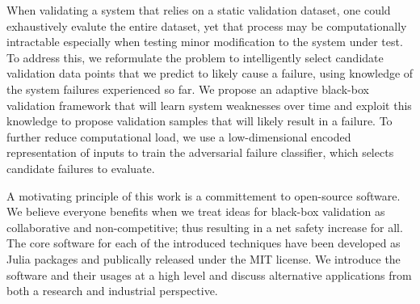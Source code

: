 When validating a system that relies on a static validation dataset, one could exhaustively evalute the entire dataset, yet that process may be computationally intractable especially when testing minor modification to the system under test.
To address this, we reformulate the problem to intelligently select candidate validation data points that we predict to likely cause a failure, using knowledge of the system failures experienced so far.
We propose an adaptive black-box validation framework that will learn system weaknesses over time and exploit this knowledge to propose validation samples that will likely result in a failure.
To further reduce computational load, we use a low-dimensional encoded representation of inputs to train the adversarial failure classifier, which selects candidate failures to evaluate.

A motivating principle of this work is a committement to open-source software.
We believe everyone benefits when we treat ideas for black-box validation as collaborative and non-competitive; thus resulting in a net safety increase for all.
The core software for each of the introduced techniques have been developed as Julia packages and publically released under the MIT license.
We introduce the software and their usages at a high level and discuss alternative applications from both a research and industrial perspective.